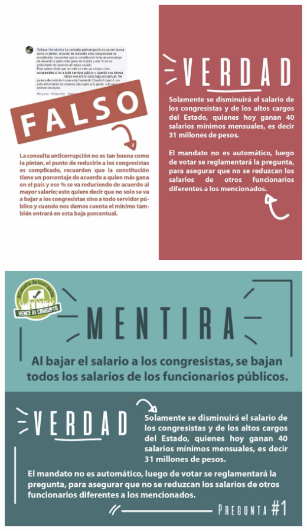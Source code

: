 \documentclass[twoside]{article}
\begin{document}
\begin{minipage}{0.45\linewidth}
  \includegraphics[scale=.175]{Images/mentira_consulta_anticorrupcion_salario_congresitas.jpeg}
\end{minipage}\hfill
\begin{minipage}{0.45\linewidth}
  \includegraphics[scale=.175]{Images/mentira_consulta_anticorrupcion_salario_funcionarios_publicos.jpeg}
\end{minipage}
\end{document}
